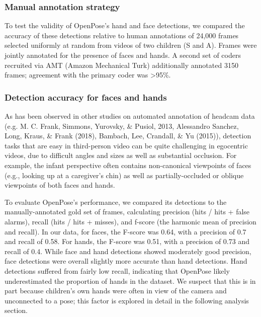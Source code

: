 \documentclass[10pt, letterpaper]{article}
\begin{document}
\subsubsection{Manual annotation
strategy}\label{manual-annotation-strategy}

To test the validity of OpenPose's hand and face detections, we compared
the accuracy of these detections relative to human annotations of 24,000
frames selected uniformly at random from videos of two children (S and
A). Frames were jointly annotated for the presence of faces and hands. A
second set of coders recruited via AMT (Amazon Mechanical Turk)
additionally annotated 3150 frames; agreement with the primary coder was
\textgreater{}95\%.

\subsubsection{Detection accuracy for faces and
hands}\label{detection-accuracy-for-faces-and-hands}

As has been observed in other studies on automated annotation of headcam
data (e.g. M. C. Frank, Simmons, Yurovsky, \& Pusiol, 2013, Alessandro
Sanchez, Long, Kraus, \& Frank (2018), Bambach, Lee, Crandall, \& Yu
(2015)), detection tasks that are easy in third-person video can be
quite challenging in egocentric videos, due to difficult angles and
sizes as well as substantial occlusion. For example, the infant
perspective often contains non-canonical viewpoints of faces (e.g.,
looking up at a caregiver's chin) as well as partially-occluded or
oblique viewpoints of both faces and hands.

To evaluate OpenPose's performance, we compared its detections to the
manually-annotated gold set of frames, calculating precision (hits /
hits + false alarms), recall (hits / hits + misses), and f-score (the
harmonic mean of precision and recall). In our data, for faces, the
F-score was 0.64, with a precision of 0.7 and recall of 0.58. For hands,
the F-score was 0.51, with a precision of 0.73 and recall of 0.4. While
face and hand detections showed moderately good precision, face
detections were overall slightly more accurate than hand detections.
Hand detections suffered from fairly low recall, indicating that
OpenPose likely underestimated the proportion of hands in the dataset.
We suspect that this is in part because children's own hands were often
in view of the camera and unconnected to a pose; this factor is explored
in detail in the following analysis section.
\end{document}
